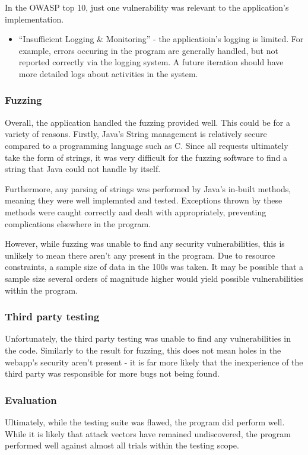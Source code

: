 In the OWASP top 10, just one vulnerability was relevant to the application's implementation.

\begin{itemize}

    \item ``Insufficient Logging \& Monitoring'' - the applicatioin's logging is limited. For example, errors occuring in the program are generally handled, but not reported correctly via the logging system. A future iteration should have more detailed logs about activities in the system.

\end{itemize}

\subsubsection{Fuzzing}

Overall, the application handled the fuzzing provided well. This could be for a variety of reasons. Firstly, Java's String management is relatively secure compared to a programming language such as C. Since all requests ultimately take the form of strings, it was very difficult for the fuzzing software to find a string that Java could not handle by itself.

Furthermore, any parsing of strings was performed by Java's in-built methods, meaning they were well implemnted and tested. Exceptions thrown by these methods were caught correctly and dealt with appropriately, preventing complications elsewhere in the program.

However, while fuzzing was unable to find any security vulnerabilities, this is unlikely to mean there aren't any present in the program. Due to resource constraints, a sample size of data in the 100s was taken. It may be possible that a sample size several orders of magnitude higher would yield possible vulnerabilities within the program. 

\subsubsection{Third party testing}

Unfortunately, the third party testing was unable to find any vulnerabilities in the code. Similarly to the result for fuzzing, this does not mean holes in the webapp's security aren't present - it is far more likely that the inexperience of the third party was responsible for more bugs not being found.

\subsubsection{Evaluation}

Ultimately, while the testing suite was flawed, the program did perform well. While it is likely that attack vectors have remained undiscovered, the program performed well against almost all trials within the testing scope.